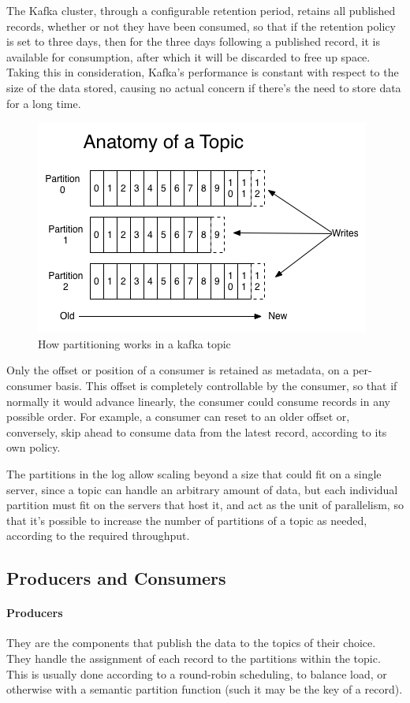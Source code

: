 The Kafka cluster, through a configurable retention period, retains all published records, whether or not they have been consumed, so that if the retention policy is set to three days, then for the three days following a published record, it is available for consumption, after which it will be discarded to free up space. Taking this in consideration, Kafka's performance is constant with respect to the size of the data stored, causing no actual concern if there's the need to store data for a long time.


\begin{figure}[h]
    \centering
    \includegraphics[width=0.7\linewidth]{Figures/log_anatomy}
    \caption[How partition works in kafka a topic]{How partitioning works in a kafka topic}
    \label{fig:loganatomy}
\end{figure}

Only the offset or position of a consumer is retained as metadata, on a per-consumer basis. This offset is completely controllable by the consumer, so that if normally it would advance linearly, the consumer could consume records in any possible order. For example, a consumer can reset to an older offset or, conversely, skip ahead to consume data from the latest record, according to its own policy.

The partitions in the log allow scaling beyond a size that could fit on a single server, since a topic can handle an arbitrary amount of data, but each individual partition must fit on the servers that host it, and act as the unit of parallelism, so that it's possible to increase the number of partitions of a topic as needed, according to the required throughput.

\subsection{Producers and Consumers}

\paragraph{Producers} They are the components that publish the data to the topics of their choice. They handle the assignment of each record to the partitions within the topic. This is usually done according to a round-robin scheduling, to balance load, or otherwise with a semantic partition function (such it may be the key of a record).

